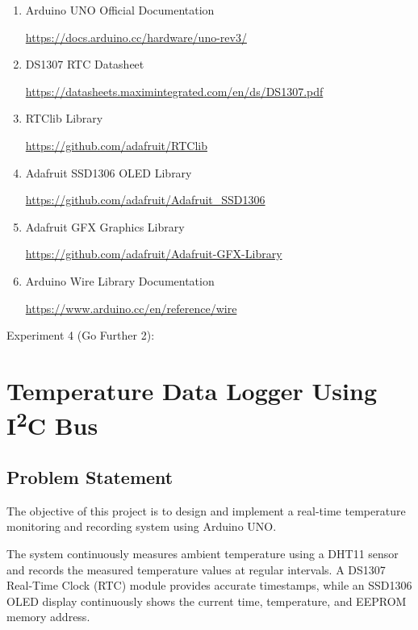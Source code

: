 \begin{enumerate}

\item Arduino UNO Official Documentation

\url{https://docs.arduino.cc/hardware/uno-rev3/}

\item DS1307 RTC Datasheet

\url{https://datasheets.maximintegrated.com/en/ds/DS1307.pdf}

\item RTClib Library

\url{https://github.com/adafruit/RTClib}

\item Adafruit SSD1306 OLED Library

\url{https://github.com/adafruit/Adafruit_SSD1306}

\item Adafruit GFX Graphics Library

\url{https://github.com/adafruit/Adafruit-GFX-Library}

\item Arduino Wire Library Documentation

\url{https://www.arduino.cc/en/reference/wire}

\end{enumerate}


\clearpage


\clearpage
Experiment 4 (Go Further 2): 
\section{Temperature Data Logger Using I\textsuperscript{2}C Bus}


\subsection{Problem Statement}

The objective of this project is to design and implement a real-time temperature monitoring and recording system using Arduino UNO.

The system continuously measures ambient temperature using a DHT11 sensor and records the measured temperature values at regular intervals. A DS1307 Real-Time Clock (RTC) module provides accurate timestamps, while an SSD1306 OLED display continuously shows the current time, temperature, and EEPROM memory address.

